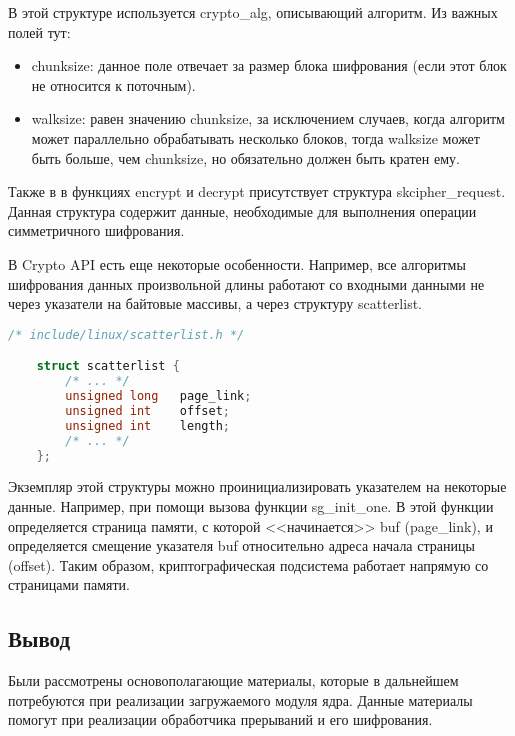 В этой структуре используется crypto\_alg, описывающий алгоритм.
Из важных полей тут:

\begin{itemize}
    \item chunksize: данное поле отвечает за размер блока шифрования (если этот блок не относится к поточным).
    \item walksize: равен значению chunksize, за исключением случаев, когда алгоритм может параллельно обрабатывать несколько блоков, тогда walksize может быть больше, чем chunksize, но обязательно должен быть кратен ему.
\end{itemize}

Также в в функциях encrypt и decrypt присутствует структура skcipher\_request.
Данная структура содержит данные, необходимые для выполнения операции симметричного шифрования.

В Crypto API есть еще некоторые особенности.
Например, все алгоритмы шифрования данных произвольной длины работают со входными данными не через указатели на байтовые массивы, а через структуру scatterlist.

\begin{lstlisting}[language=c, label=some-code, caption=Структура skcipher\_alg]
    /* include/linux/scatterlist.h */

    struct scatterlist {
        /* ... */
        unsigned long   page_link;
        unsigned int    offset;
        unsigned int    length;
        /* ... */
    };
\end{lstlisting}

Экземпляр этой структуры можно проинициализировать указателем на некоторые данные. Например, при помощи вызова функции sg\_init\_one.
В этой функции определяется страница памяти, с которой <<начинается>> buf (page\_link), и определяется смещение указателя buf относительно адреса начала страницы (offset).
Таким образом, криптографическая подсистема работает напрямую со страницами памяти.

\subsection*{Вывод}

Были рассмотрены основополагающие материалы, которые в дальнейшем
потребуются при реализации загружаемого модуля ядра. 
Данные материалы помогут
при реализации обработчика прерываний и его шифрования.
